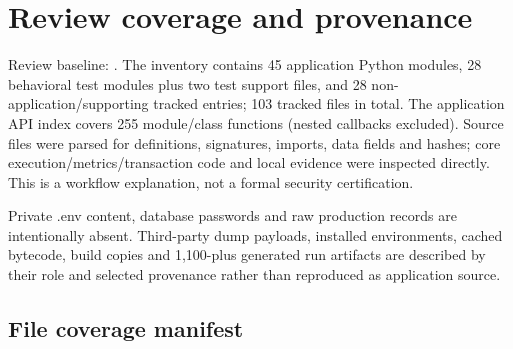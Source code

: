 \chapter{Review coverage and provenance}

Review baseline: . The inventory contains 45 application Python modules, 28 behavioral test modules plus two test support files, and 28 non-application/supporting tracked entries; 103 tracked files in total. The application API index covers 255 module/class functions (nested callbacks excluded). Source files were parsed for definitions, signatures, imports, data fields and hashes; core execution/metrics/transaction code and local evidence were inspected directly. This is a workflow explanation, not a formal security certification.

Private .env content, database passwords and raw production records are intentionally absent. Third-party dump payloads, installed environments, cached bytecode, build copies and 1,100-plus generated run artifacts are described by their role and selected provenance rather than reproduced as application source.

\section{File coverage manifest}

